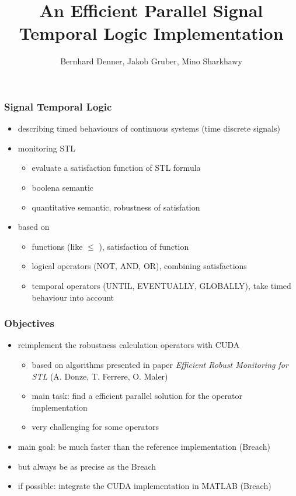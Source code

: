 \documentclass[notes=show]{beamer}
\title{An Efficient Parallel Signal Temporal Logic Implementation}
\author{
	Bernhard Denner,
	Jakob Gruber,
	Mino Sharkhawy
}
\begin{document}
\maketitle

\begin{frame}
\frametitle{Signal Temporal Logic}
\begin{itemize}
    \item describing timed behaviours of continuous systems (time discrete signals)
    \item monitoring STL 
          \begin{itemize}
        	\item evaluate a satisfaction function of STL formula
        	\item boolena semantic
        	\item quantitative semantic, robustness of satisfation
          \end{itemize}
    \item based on
          \begin{itemize}
        	\item functions (like $\leq$ ), satisfaction of function
        	\item logical operators (NOT, AND, OR), combining satisfactions
        	\item temporal operators (UNTIL, EVENTUALLY, GLOBALLY), take timed behaviour into account
          \end{itemize}
\end{itemize}
\end{frame}

\begin{frame}
\frametitle{Objectives}
\begin{itemize}
	\item reimplement the robustness calculation operators with CUDA
	\begin{itemize}
	    \item based on algorithms presented in paper \emph{Efficient Robust Monitoring for STL} (A. Donze, T. Ferrere, O. Maler)
	    \item main task: find a efficient parallel solution for the operator implementation
	    \item very challenging for some operators
    \end{itemize}
	\item main goal: be much faster than the reference implementation (Breach)
	\item but always be as precise as the Breach
	\item if possible: integrate the CUDA implementation in MATLAB (Breach)
\end{itemize}
\end{frame}
\end{document}
